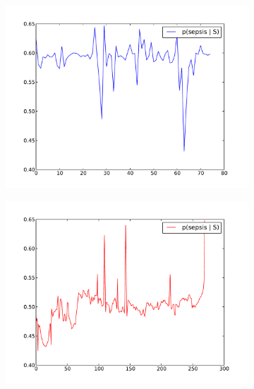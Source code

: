 \documentclass[12pt,solutions]{article}
\begin{document}
\begin{figure}
        \centering
        \begin{subfigure}[b]{0.4\textwidth}
                \includegraphics[width=\textwidth]{nn_plots/probs_c0_1}
                \caption{}
                \label{fig:c0_0}
        \end{subfigure}
        \begin{subfigure}[b]{0.4\textwidth}
                \includegraphics[width=\textwidth]{nn_plots/probs_c1_2}
                \caption{}
                \label{fig:c0_0}
        \end{subfigure}
        \begin{subfigure}[b]{0.4\textwidth}

\end{subfigure}
\end{figure}
\end{document}
